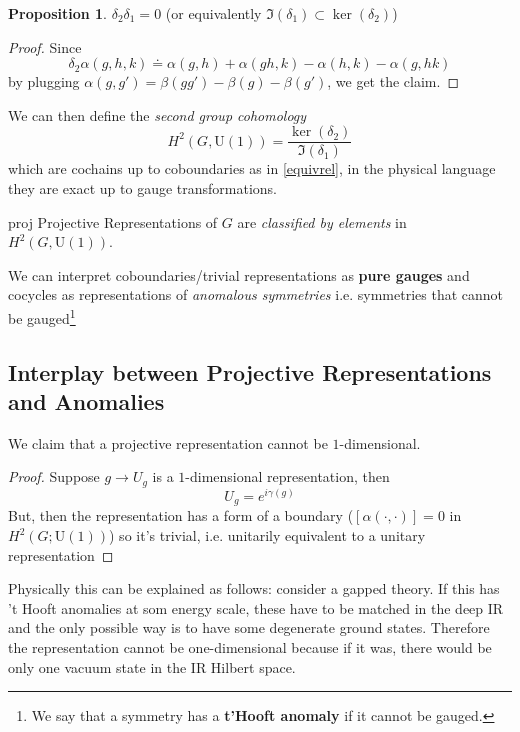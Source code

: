 \documentclass[11pt]{article}
\theoremstyle{definition}
\newtheorem{proposition}{Proposition}[section]
\numberwithin{equation}{section}
\newcommand*\U{\mathrm{U}}
\begin{document}
\begin{proposition}
    $\delta_2 \delta_1=0$ (or equivalently $\Im(\delta_1) \subset \ker(\delta_2)$)
\end{proposition}
\begin{proof}
    Since
\begin{equation}
    \delta_2 \alpha(g,h,k) \doteq \alpha(g,h) + \alpha(gh,k) - \alpha(h,k) -\alpha(g,hk)
\end{equation}
by plugging $\alpha(g,g') = \beta(gg') -\beta(g) -\beta(g')$, we get the claim.
\end{proof}
We can then define the \textit{second group cohomology}
\begin{equation}
    H^2(G, \U(1)) = \frac{\ker(\delta_2)}{\Im(\delta_1)}
\end{equation}
which are cochains up to coboundaries as in \eqref{equivrel}, in the physical language they are exact up to gauge transformations.\\

\begin{thm}{}{proj}
    Projective Representations of $G$ are \textit{classified by elements} in $ H^2(G, \U(1))$.
\end{thm}
We can interpret coboundaries/trivial representations as \textbf{pure gauges} and cocycles as representations of \textit{anomalous symmetries} i.e. symmetries that cannot be gauged\footnote{We say that a symmetry has a \textbf{t'Hooft anomaly} if it cannot be gauged.}


\subsection{Interplay between Projective Representations and Anomalies}
We claim that a projective representation cannot be $1$-dimensional.
\begin{proof}
    Suppose $g \to U_g$ is a $1$-dimensional representation, then
\begin{equation}
        U_g = e^{i \gamma(g)}
\end{equation}
But, then the representation has a form of a boundary ($[\alpha(\cdot, \cdot)] = 0 $ in $H^2(G; \U(1))$) so it's trivial, i.e. unitarily equivalent to a unitary representation
\end{proof}
Physically this can be explained as follows: consider a gapped theory. If this has 't Hooft anomalies at som energy scale, these have to be matched in the deep IR and the only possible way is to have some degenerate ground states. Therefore the representation cannot be one-dimensional because if it was, there would be only one vacuum state in the IR Hilbert space.
\end{document}
